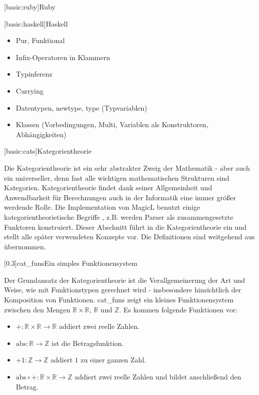 \documentclass[a4paper, bibgerm]{article}
\newcommand\lsubsection{}
\newcommand\abb{}
\newcommand\fig{}
\newcommand\ato{\rightarrow}
\begin{document}
\lsubsection[basic:ruby]{Ruby}

\lsubsection[basic:haskell]{Haskell}

\begin{itemize}
\item Pur, Funktional
\item Infix-Operatoren in Klammern
\item Typinferenz
\item Currying
\item Datentypen, newtype, type (Typvariablen)
\item Klassen (Vorbedingungen, Multi, Variablen als Konstruktoren, Abhängigkeiten)
\end{itemize}

\lsubsection[basic:cats]{Kategorientheorie}

Die Kategorientheorie ist ein sehr abstrakter Zweig der Mathematik -
aber auch ein universeller, denn fast alle wichtigen mathematischen
Strukturen sind Kategorien. Kategorientheorie findet dank seiner
Allgemeinheit und Anwendbarkeit für Berechnungen auch in der Informatik
eine immer größer werdende Rolle. Die Implementation von MagicL benutzt
einige kategorientheorietische Begriffe , z.B. werden Parser als
zusammengesetzte Funktoren konstruiert. Dieser Abschnitt führt in die
Kategorientheorie ein und stellt alle später verwendeten Konzepte
vor. Die Definitionen sind weitgehend aus \cite{Grundlagen} übernommen.

\fig[0.3]{cat_funs}{Ein simples Funktionensystem}

Der Grundansatz der Kategorientheorie ist die Verallgemeinerung der
Art und Weise, wie mit Funktionstypen gerechnet wird - insbesondere
hinsichtlich der Komposition von Funktionen. \abb{cat_funs} zeigt ein
kleines Funktionensystem zwischen den Mengen $\mathbb{R} \times
\mathbb{R}$, $\mathbb{R}$ und $\mathbb{Z}$. Es kommen folgende
Funktionen vor:
\begin{itemize}
\item $+ : \mathbb{R} \times \mathbb{R} \ato \mathbb{R}$ addiert zwei
  reelle Zahlen.
\item $\mathrm{abs} : \mathbb{R} \ato \mathbb{Z}$ ist die Betragsfunktion.
\item $+1 : \mathbb{Z} \ato \mathbb{Z}$ addiert $1$ zu einer ganzen Zahl.
\item $\mathrm{abs} \circ + : \mathbb{R} \times \mathbb{R} \ato \mathbb{Z}$
  addiert zwei reelle Zahlen und bildet anschließend den Betrag.
\end{itemize}
\end{document}
